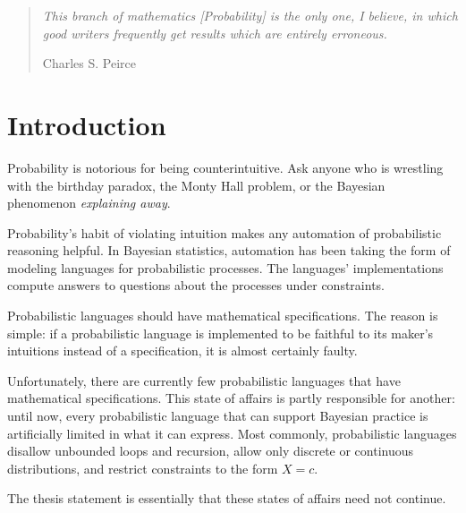 \newcommand{\Normal}{\mathrm{Normal}}
\newcommand{\Borel}{\mathcal{B}}
\newcommand{\Ex}{\mathbb{E}}

\begin{quote}
\textit{This branch of mathematics [Probability] is the only one, I believe, in which good writers frequently get results which are entirely erroneous.}

\hfill Charles S. Peirce
\end{quote}

\section{Introduction}

Probability is notorious for being counterintuitive.
Ask anyone who is wrestling with the birthday paradox, the Monty Hall problem, or the Bayesian phenomenon \emph{explaining away}.

Probability's habit of violating intuition makes any automation of probabilistic reasoning helpful.
In Bayesian statistics, automation has been taking the form of modeling languages for probabilistic processes.
The languages' implementations compute answers to questions about the processes under constraints.

Probabilistic languages should have mathematical specifications.
The reason is simple: if a probabilistic language is implemented to be faithful to its maker's intuitions instead of a specification, it is almost certainly faulty.

Unfortunately, there are currently few probabilistic languages that have mathematical specifications.
This state of affairs is partly responsible for another: until now, every probabilistic language that can support Bayesian practice is artificially limited in what it can express.
Most commonly, probabilistic languages disallow unbounded loops and recursion, allow only discrete or continuous distributions, and restrict constraints to the form $X = c$.

The thesis statement is essentially that these states of affairs need not continue.

\newpage


